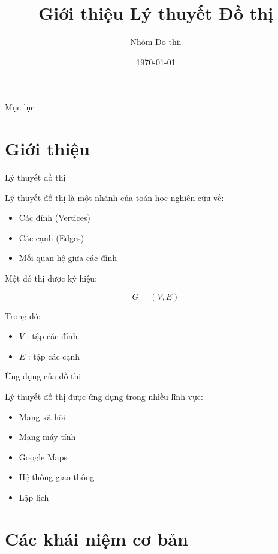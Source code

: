 \documentclass{beamer}
\title{Giới thiệu Lý thuyết Đồ thị}
\author{Nhóm Do-thii}
\date{\today}
\begin{document}
\frame{\titlepage}


\begin{frame}{Mục lục}
\tableofcontents
\end{frame}

\section{Giới thiệu}

\begin{frame}{Lý thuyết đồ thị}

Lý thuyết đồ thị là một nhánh của toán học nghiên cứu về:

\begin{itemize}
\item Các đỉnh (Vertices)
\item Các cạnh (Edges)
\item Mối quan hệ giữa các đỉnh
\end{itemize}

Một đồ thị được ký hiệu:

\[
G = (V, E)
\]

Trong đó:

\begin{itemize}
\item $V$ : tập các đỉnh
\item $E$ : tập các cạnh
\end{itemize}

\end{frame}

\begin{frame}{Ứng dụng của đồ thị}

Lý thuyết đồ thị được ứng dụng trong nhiều lĩnh vực:

\begin{itemize}
\item Mạng xã hội
\item Mạng máy tính
\item Google Maps
\item Hệ thống giao thông
\item Lập lịch
\end{itemize}

\end{frame}

\section{Các khái niệm cơ bản}
\end{document}
